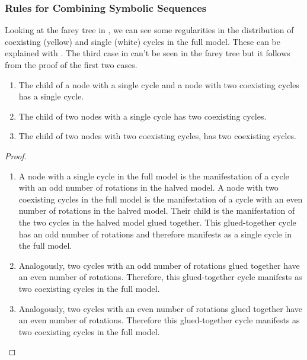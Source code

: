 \subsubsection{Rules for Combining Symbolic Sequences}

Looking at the farey tree in , we can see some regularities in the distribution of coexisting (yellow) and single (white) cycles in the full model.
These can be explained with .
The third case in  can't be seen in the farey tree but it follows from the proof of the first two cases.

\begin{theorem}
    \label{theorem:child.coexistence}
    \begin{enumerate}
        \item The child of a node with a single cycle and a node with two coexisting cycles has a single cycle.
        \item The child of two nodes with a single cycle has two coexisting cycles.
        \item The child of two nodes with two coexisting cycles, has two coexisting cycles.
    \end{enumerate}
\end{theorem}

\begin{proof} \phantom{x}
    \begin{enumerate}
        \item A node with a single cycle in the full model is the manifestation of a cycle with an odd number of rotations in the halved model.
              A node with two coexisting cycles in the full model is the manifestation of a cycle with an even number of rotations in the halved model.
              Their child is the manifestation of the two cycles in the halved model glued together.
              This glued-together cycle has an odd number of rotations and therefore manifests as a single cycle in the full model.
        \item Analogously, two cycles with an odd number of rotations glued together have an even number of rotations.
              Therefore, this glued-together cycle manifests as two coexisting cycles in the full model.
        \item Analogously, two cycles with an even number of rotations glued together have an even number of rotations.
              Therefore this glued-together cycle manifests as two coexisting cycles in the full model.
    \end{enumerate}
\end{proof}

